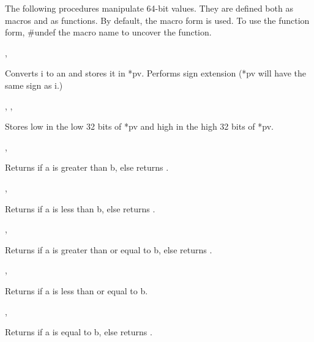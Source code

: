 The following procedures manipulate 64-bit values.  They are defined
both as macros and as functions.  By default, the macro form is used.
To use the function form, \#undef the macro name to uncover the
function.


,
\cendmacrodecl

Converts i to an  and stores it in
*pv.  Performs sign extension (*pv will have the
same sign as i.)
\cendmacrodescription


,
,
\cendmacrodecl

Stores low in the low 32 bits of *pv and 
high in the high 32 bits of *pv.
\cendmacrodescription


,
\cendmacrodecl

Returns  if a is greater than b,
else returns .
\cendmacrodescription


,
\cendmacrodecl

Returns  if a is less than b,
else returns .
\cendmacrodescription


,
\cendmacrodecl

Returns  if a is greater than or equal to b,
else returns .
\cendmacrodescription


,
\cendmacrodecl

Returns  if a is less than or equal to b.
\cendmacrodescription


,
\cendmacrodecl

Returns  if a is equal to b,
else returns .
\cendmacrodescription


\cendmacrodecl

